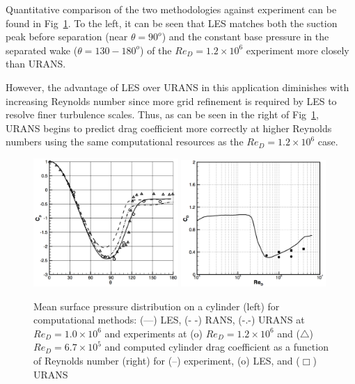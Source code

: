 \documentclass[journal]{new-aiaa}
\begin{document}
Quantitative comparison of the two methodologies against experiment can be found in Fig~\ref{fig:cylinderransvslesvalidation}. To the left, it can be seen that LES matches both the suction peak before separation (near $\theta=90^o$) and the constant base pressure in the separated wake ($\theta=130-180^o$) of the $Re_D = 1.2 \times 10^6$ experiment more closely than URANS.

However, the advantage of LES over URANS in this application diminishes with increasing Reynolds number since more grid refinement is required by LES to resolve finer turbulence scales. Thus, as can be seen in the right of Fig~\ref{fig:cylinderransvslesvalidation}, URANS begins to predict drag coefficient more correctly at higher Reynolds numbers using the same computational resources as the $Re_D = 1.2 \times 10^6$ case.





\begin{figure}[H]
\begin{center}
\includegraphics[width=0.49\textwidth]{Images/logan/catalano2003numerical_CylinderCp.pdf}
\includegraphics[width=0.49\textwidth]{Images/logan/catalano2003numerical_CylinderDrag.pdf}
\caption{ Mean surface pressure distribution on a cylinder (left) for computational methods: (---) LES, (- -) RANS, (-.-) URANS at $Re_D = 1.0 \times 10^6$ and experiments at (o) $Re_D = 1.2 \times 10^6$ and ($\triangle$) $Re_D = 6.7 \times 10^5$ and computed cylinder drag coefficient as a function of Reynolds number (right) for (--) experiment, (o) LES, and ($\Box$) URANS \cite{catalano2003numerical} }
\label{fig:cylinderransvslesvalidation}
\end{center}
\end{figure}
\end{document}
